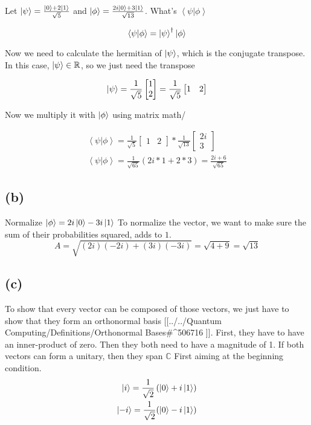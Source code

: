 \documentclass[]{article}
\begin{document}
Let \(\ket{\psi}=\frac{{\ket{0}+2\ket{1}}}{\sqrt{ 5 }}\) and
\(\ket{\phi} = \frac{{2i\ket{0}+3\ket{1}}}{\sqrt{ 13 }}\). What's
\(\left<\psi|\phi\right>\)

\[
\left<\psi|\phi\right> = \ket{\psi} ^{\dagger}\ket{\phi} 
\]

Now we need to calculate the hermitian of \(\ket{\psi}\), which is the
conjugate transpose. In this case, \(\ket{\psi}\in\mathbb{R}\), so we
just need the transpose

\[
\ket{\psi}  = \frac{1}{\sqrt{ 5 }}\begin{bmatrix}
1 \\
2
\end{bmatrix}=\frac{1}{\sqrt{ 5 }}\begin{bmatrix}
1 & 2
\end{bmatrix}
\]

Now we multiply it with \(\ket{\phi}\) using matrix math/

\[
\begin{align}
\left<\psi|\phi\right> = \frac{1}{\sqrt{ 5 }}\begin{bmatrix}
1 & 2
\end{bmatrix}* \frac{1}{\sqrt{ 13 }}\begin{bmatrix}
2i \\
3
\end{bmatrix} \\
\left<\psi|\phi\right> =\frac{1}{\sqrt{ 65 }}\left( 2i*1+2*3 \right) =\frac{2i+6}{\sqrt{ 65 }}
\end{align}
\]

\hypertarget{b-3}{%
\subsection{(b)}\label{b-3}}

Normalize \(\ket{\phi} = 2i\ket{0}-3i\ket{1}\) To normalize the vector,
we want to make sure the sum of their probabilities squared, adds to
\(1\). \[
A = \sqrt{ (2i)(-2i)+(3i)(-3i) } = \sqrt{ 4+9 } = \sqrt{ 13 }
\]

\hypertarget{c-3}{%
\subsection{(c)}\label{c-3}}

To show that every vector can be composed of those vectors, we just have
to show that they form an orthonormal basis {[}{[}../../Quantum
Computing/Definitions/Orthonormal Bases\#\^{}506716\textbar{} {]}{]}.
First, they have to have an inner-product of zero. Then they both need
to have a magnitude of 1. If both vectors can form a unitary, then they
span \(\mathbb{C}\) First aiming at the beginning condition. \[
\begin{align}
\ket{i} =\frac{1}{\sqrt{ 2 }}\left( \ket{0} +i\ket{1}  \right) \\
\ket{-i} = \frac{1}{\sqrt{ 2 }}(\ket{0} -i\ket{1} )  
\end{align}
\]
\end{document}
